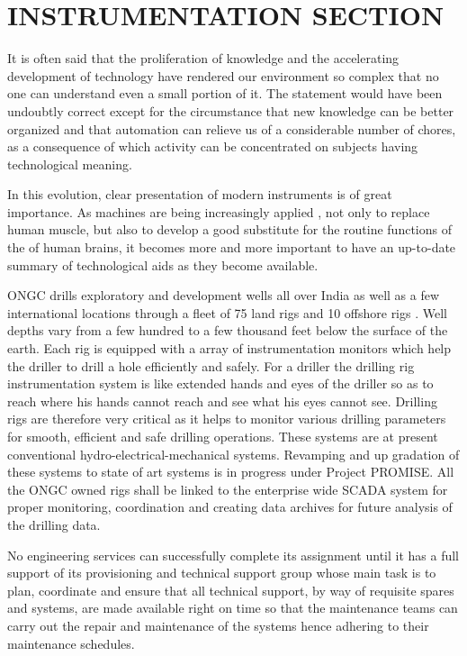 \chapter{INSTRUMENTATION SECTION}

It is often said that the proliferation of knowledge and the accelerating development of technology 
have rendered our environment so complex that no one can understand even a small portion of it. 
The statement would have been undoubtly correct except for the circumstance that new knowledge can 
be better organized and that automation can relieve us of a considerable number of chores, as a
consequence of which activity can be concentrated on subjects having technological meaning. 

\vspace{1em}

In this evolution, clear presentation of modern instruments is of great importance. As machines are
being increasingly applied , not only to replace human muscle, but also to develop a good substitute 
for the routine functions of the of human brains, it becomes more and more important to have an 
up-to-date summary of technological aids as they become available.

\vspace{1em}

ONGC drills exploratory and development wells all over India as well as a few international 
locations through a fleet of 75 land rigs and 10 offshore rigs . Well depths vary from a few 
hundred to a few thousand feet below the surface of the earth. Each rig is equipped with a array 
of instrumentation monitors which help the driller to drill a hole efficiently and safely. 
For a driller the drilling rig instrumentation system is like extended hands and eyes of the driller 
so as to reach where his hands cannot reach and see what his eyes cannot see. Drilling rigs are 
therefore very critical as it helps to monitor various drilling parameters for smooth,
efficient and safe drilling operations. These systems are at present conventional
hydro-electrical-mechanical systems. Revamping and up gradation of these systems to state of art 
systems is in progress under Project PROMISE. All the ONGC owned rigs shall be linked to 
the enterprise wide SCADA system for proper monitoring, coordination and creating data archives 
for future analysis of the drilling data.


\vspace{1em}

No engineering services can successfully complete its assignment until it has a full support 
of its provisioning and technical support group whose main task is to plan, coordinate and ensure
that all technical support, by way of requisite spares and systems, are made available right on
time so that the maintenance teams can carry out the repair and maintenance of the systems hence
adhering to their maintenance schedules.


